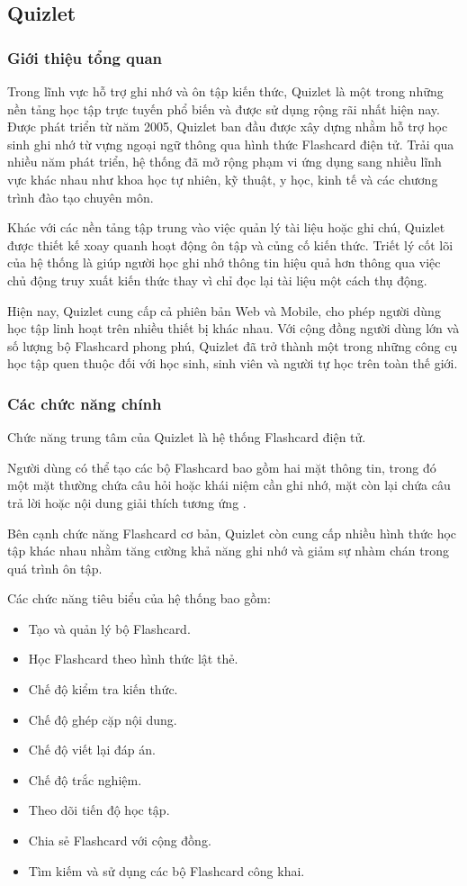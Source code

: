 \subsection{Quizlet}
\subsubsection{Giới thiệu tổng quan}

Trong lĩnh vực hỗ trợ ghi nhớ và ôn tập kiến thức, Quizlet là một trong những nền tảng học tập trực tuyến phổ biến và được sử dụng rộng rãi nhất hiện nay. Được phát triển từ năm 2005, Quizlet ban đầu được xây dựng nhằm hỗ trợ học sinh ghi nhớ từ vựng ngoại ngữ thông qua hình thức Flashcard điện tử. Trải qua nhiều năm phát triển, hệ thống đã mở rộng phạm vi ứng dụng sang nhiều lĩnh vực khác nhau như khoa học tự nhiên, kỹ thuật, y học, kinh tế và các chương trình đào tạo chuyên môn.

Khác với các nền tảng tập trung vào việc quản lý tài liệu hoặc ghi chú, Quizlet được thiết kế xoay quanh hoạt động ôn tập và củng cố kiến thức. Triết lý cốt lõi của hệ thống là giúp người học ghi nhớ thông tin hiệu quả hơn thông qua việc chủ động truy xuất kiến thức thay vì chỉ đọc lại tài liệu một cách thụ động.

Hiện nay, Quizlet cung cấp cả phiên bản Web và Mobile, cho phép người dùng học tập linh hoạt trên nhiều thiết bị khác nhau. Với cộng đồng người dùng lớn và số lượng bộ Flashcard phong phú, Quizlet đã trở thành một trong những công cụ học tập quen thuộc đối với học sinh, sinh viên và người tự học trên toàn thế giới.

\subsubsection{Các chức năng chính}

Chức năng trung tâm của Quizlet là hệ thống Flashcard điện tử.

Người dùng có thể tạo các bộ Flashcard bao gồm hai mặt thông tin, trong đó một mặt thường chứa câu hỏi hoặc khái niệm cần ghi nhớ, mặt còn lại chứa câu trả lời hoặc nội dung giải thích tương ứng \cite{quizletFlashcards}.

Bên cạnh chức năng Flashcard cơ bản, Quizlet còn cung cấp nhiều hình thức học tập khác nhau nhằm tăng cường khả năng ghi nhớ và giảm sự nhàm chán trong quá trình ôn tập.

Các chức năng tiêu biểu của hệ thống bao gồm:
\begin{itemize}
    \item Tạo và quản lý bộ Flashcard.
    \item Học Flashcard theo hình thức lật thẻ.
    \item Chế độ kiểm tra kiến thức.
    \item Chế độ ghép cặp nội dung.
    \item Chế độ viết lại đáp án.
    \item Chế độ trắc nghiệm.
    \item Theo dõi tiến độ học tập.
    \item Chia sẻ Flashcard với cộng đồng.
    \item Tìm kiếm và sử dụng các bộ Flashcard công khai.
\end{itemize}

